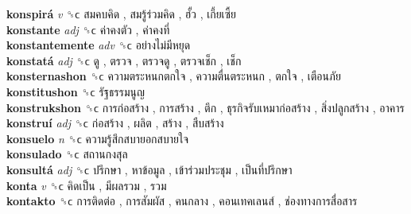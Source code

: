 \textbf{konspirá} \emph{v}  ␝ϲ   สมคบคิด ,  สมรู้ร่วมคิด ,  ฮั้ว ,  เกี้ยเซี้ย   \\
\textbf{konstante} \emph{adj}  ␝ϲ   ค่าคงตัว ,  ค่าคงที่   \\
\textbf{konstantemente} \emph{adv}  ␝ϲ   อย่างไม่มีหยุด   \\
\textbf{konstatá} \emph{adj}  ␝ϲ   ดู ,  ตรวจ ,  ตรวจดู ,  ตรวจเช็ก ,  เช็ก   \\
\textbf{konsternashon} ␝ϲ   ความตระหนกตกใจ ,  ความตื่นตระหนก ,  ตกใจ ,  เตือนภัย   \\
\textbf{konstitushon} ␝ϲ   รัฐธรรมนูญ   \\
\textbf{konstrukshon} ␝ϲ   การก่อสร้าง ,  การสร้าง ,  ตึก ,  ธุรกิจรับเหมาก่อสร้าง ,  สิ่งปลูกสร้าง ,  อาคาร   \\
\textbf{konstruí} \emph{adj}  ␝ϲ   ก่อสร้าง ,  ผลิต ,  สร้าง ,  สืบสร้าง   \\
\textbf{konsuelo} \emph{n}  ␝ϲ   ความรู้สึกสบายอกสบายใจ   \\
\textbf{konsulado} ␝ϲ   สถานกงสุล   \\
\textbf{konsultá} \emph{adj}  ␝ϲ   ปรึกษา ,  หาข้อมูล ,  เข้าร่วมประชุม ,  เป็นที่ปรึกษา   \\
\textbf{konta} \emph{v}  ␝ϲ   คิดเป็น ,  มีผลรวม ,  รวม   \\
\textbf{kontakto} ␝ϲ   การติดต่อ ,  การสัมผัส ,  คนกลาง ,  คอนเทคเลนส์ ,  ช่องทางการสื่อสาร   \\
